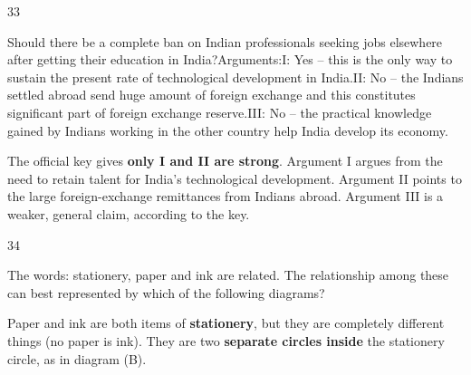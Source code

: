 \begin{question}{33}
{Should there be a complete ban on Indian professionals seeking jobs elsewhere after getting their education in India?\newline Arguments:\newline I: Yes -- this is the only way to sustain the present rate of technological development in India.\newline II: No -- the Indians settled abroad send huge amount of foreign exchange and this constitutes significant part of foreign exchange reserve.\newline III: No -- the practical knowledge gained by Indians working in the other country help India develop its economy.\par}
\begin{explain}
The official key gives \textbf{only I and II are strong}. Argument I argues from the need to retain talent for India's technological development. Argument II points to the large foreign-exchange remittances from Indians abroad. Argument III is a weaker, general claim, according to the key.
\end{explain}
\end{question}

\begin{question}{34}
{The words: stationery, paper and ink are related. The relationship among these can best represented by which of the following diagrams?\par}
\begin{explain}
Paper and ink are both items of \textbf{stationery}, but they are completely different things (no paper is ink). They are two \textbf{separate circles inside} the stationery circle, as in diagram (B).
\end{explain}
\end{question}

